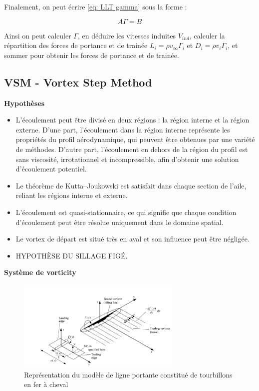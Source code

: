 Finalement, on peut écrire \ref{eq: LLT gamma} sous la forme :

\begin{equation}
    A \Gamma = B
    \label{eq: LLT gamma 2 }
\end{equation}

Ainsi on peut calculer $\Gamma$, en déduire les vitesses induites $V_{ind}$, calculer la répartition des forces de portance et de trainée $L_i = \rho v_{\infty} \Gamma_i$ et $D_i = \rho v_i \Gamma_i$, et sommer pour obtenir les forces de portance et de trainée.

\subsection{VSM - Vortex Step Method} 
\label{subsec:Ch1.2.2}

\textbf{Hypothèses} \\
\begin{itemize}
    \item L'écoulement peut être divisé en deux régions : la région interne et la région externe. D'une part, l'écoulement dans la région interne représente les propriétés du profil aérodynamique, qui peuvent être obtenues par une variété de méthodes. D'autre part, l'écoulement en dehors de la région du profil est sans viscosité, irrotationnel et incompressible, afin d'obtenir une solution d'écoulement potentiel.
    \item Le théorème de Kutta–Joukowski est satisfait dans chaque section de l'aile, reliant les régions interne et externe.
    \item L'écoulement est quasi-stationnaire, ce qui signifie que chaque condition d'écoulement peut être résolue uniquement dans le domaine spatial.
    \item Le vortex de départ est situé très en aval et son influence peut être négligée.
    \item HYPOTHÈSE DU SILLAGE FIGÉ.
\end{itemize}

\textbf{Système de vorticity}
\begin{figure}[H]
    \centering
    \includegraphics[width=0.7\textwidth]{Pics/01 - Basses Fidélités/vortex VSM.png}
    \caption{Représentation du modèle de ligne portante constitué de tourbillons en fer à cheval}
    \label{fig: vortex vsm}
\end{figure}



